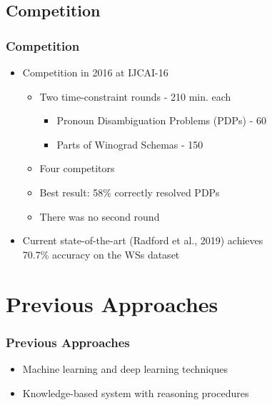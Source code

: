 \documentclass[c,8pt,xcolor...,x11names]{beamer}
\begin{document}
\subsection{Competition}

\begin{frame}
\frametitle{Competition}
	\begin{itemize}
	\normalsize
	\item Competition in 2016 at IJCAI-16
	\begin{itemize}
		\normalsize
		\item Two time-constraint rounds - 210 min. each
		\begin{itemize}
			\normalsize
			\item Pronoun Disambiguation Problems (PDPs) - 60
			\item Parts of Winograd Schemas - 150
		\end{itemize}
		\item Four competitors
		\item Best result: 58\% correctly resolved PDPs
		\item There was no second round
		
	\end{itemize}
	
	\item Current \alert{state-of-the-art} (Radford et al., 2019) achieves \\ 70.7\% accuracy on the WSs dataset
\end{itemize}
\end{frame}

\section{Previous Approaches}

\begin{frame}
\frametitle{Previous Approaches}
\begin{itemize}
	\item Machine learning and deep learning techniques
	\item Knowledge-based system with reasoning procedures
\end{itemize}



\end{frame}
\end{document}
